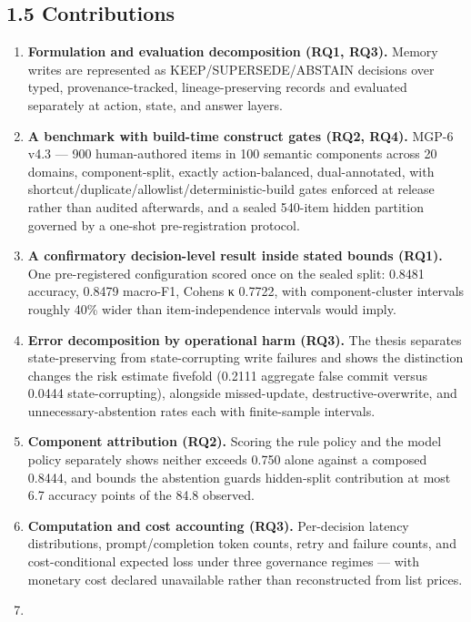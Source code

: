 \subsection{1.5 Contributions}\label{contributions}

\begin{enumerate}
\def\labelenumi{\arabic{enumi}.}
\item
  \textbf{Formulation and evaluation decomposition (RQ1, RQ3).} Memory
  writes are represented as KEEP/SUPERSEDE/ABSTAIN decisions over typed,
  provenance-tracked, lineage-preserving records and evaluated
  separately at action, state, and answer layers.
\item
  \textbf{A benchmark with build-time construct gates (RQ2, RQ4).} MGP-6
  v4.3 --- 900 human-authored items in 100 semantic components across 20
  domains, component-split, exactly action-balanced, dual-annotated,
  with shortcut/duplicate/allowlist/deterministic-build gates enforced
  at release rather than audited afterwards, and a sealed 540-item
  hidden partition governed by a one-shot pre-registration protocol.
\item
  \textbf{A confirmatory decision-level result inside stated bounds
  (RQ1).} One pre-registered configuration scored once on the sealed
  split: 0.8481 accuracy, 0.8479 macro-F1, Cohen\textquotesingle s κ
  0.7722, with component-cluster intervals roughly 40\% wider than
  item-independence intervals would imply.
\item
  \textbf{Error decomposition by operational harm (RQ3).} The thesis
  separates state-preserving from state-corrupting write failures and
  shows the distinction changes the risk estimate fivefold (0.2111
  aggregate false commit versus 0.0444 state-corrupting), alongside
  missed-update, destructive-overwrite, and unnecessary-abstention rates
  each with finite-sample intervals.
\item
  \textbf{Component attribution (RQ2).} Scoring the rule policy and the
  model policy separately shows neither exceeds 0.750 alone against a
  composed 0.8444, and bounds the abstention guard\textquotesingle s
  hidden-split contribution at most 6.7 accuracy points of the 84.8
  observed.
\item
  \textbf{Computation and cost accounting (RQ3).} Per-decision latency
  distributions, prompt/completion token counts, retry and failure
  counts, and cost-conditional expected loss under three governance
  regimes --- with monetary cost declared unavailable rather than
  reconstructed from list prices.
\item

\end{enumerate}
